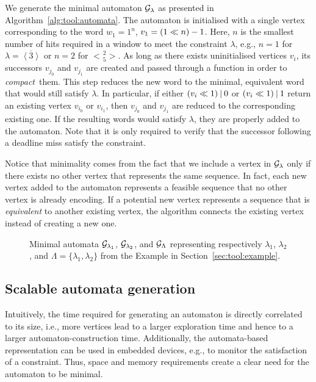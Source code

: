 We generate the minimal automaton $\mathcal{G}_{\lambda}$ as presented in Algorithm~\ref{alg:tool:automata}.
The automaton is initialised with a single vertex corresponding to the word $w_1 = 1^n$, $v_1 = \left( 1 \ll n \right) - 1$.
Here, $n$ is the smallest number of hits required in a window to meet the constraint $\lambda$, e.g., $n=1$ for $\lambda = \overline{\left<3\right>}$ or $n=2$ for $\genfrac{<}{>}{0pt}{}{2}{5}$.
As long as there exists uninitialised vertices $v_i$, its successors $v_{j_0}$ and $v_{j_1}$ are created and passed through a function in order to \emph{compact}~them.
This step reduces the new word to the minimal, equivalent word that would still satisfy $\lambda$.
In particular, if either $\left( v_i \ll 1 \right) \mathbin{|} 0$ or $\left( v_i \ll 1 \right) \mathbin{|} 1$ return an existing vertex $v_{i_0}$ or $v_{i_1}$, then $v_{j_0}$ and $v_{j_1}$ are reduced to the corresponding existing one.
If the resulting words would satisfy $\lambda$, they are properly added to the automaton.
Note that it is only required to verify that the successor following a deadline miss satisfy the constraint.

Notice that minimality comes from the fact that we include a vertex in $\mathcal{G}_{\lambda}$ only if there exists no other vertex that represents the same sequence.
In fact, each new vertex added to the automaton represents a feasible sequence that no other vertex is already encoding.
If a potential new vertex represents a sequence that is \emph{equivalent} to another existing vertex, the algorithm connects the existing vertex instead of creating a new one.

\begin{figure*}[t]
    
    \caption{Minimal automata $\mathcal{G}_{\lambda_1}$, $\mathcal{G}_{\lambda_2}$, and $\mathcal{G}_{\Lambda}$ representing respectively $\lambda_1$, $\lambda_2$, and $\Lambda = \{\lambda_1, \lambda_2\}$ from the Example in Section~\ref{sec:tool:example}.}%
    \label{fig:dominant-set}
\end{figure*}

\subsection{Scalable automata generation}%
\label{sec:tool:scalability}%

Intuitively, the time required for generating an automaton is directly correlated to its size, i.e., more vertices lead to a larger exploration time and hence to a larger automaton-construction time. 
Additionally, the automata-based representation can be used in embedded devices, e.g., to monitor the satisfaction of a constraint.
Thus, space and memory requirements create a clear need for the automaton to be minimal.

